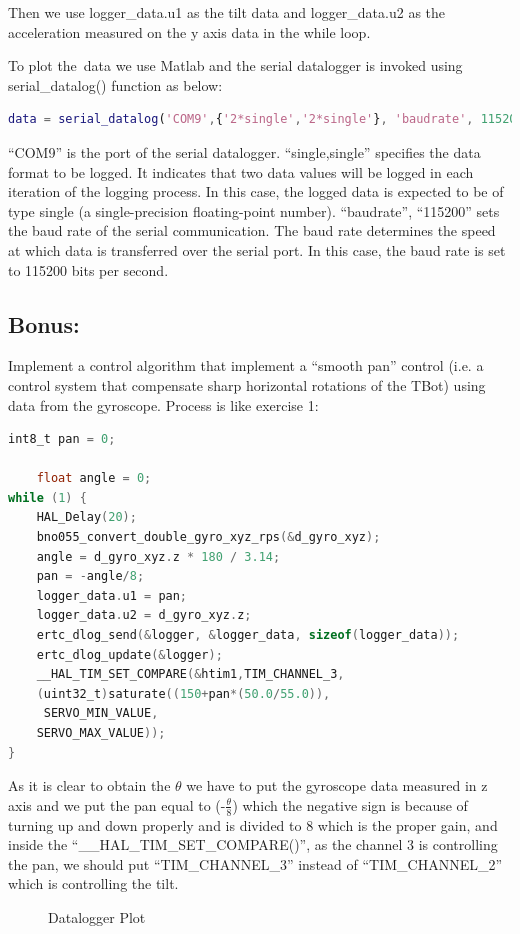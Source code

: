 \documentclass[english]{article}
\begin{document}
Then we use logger\_data.u1 as the tilt data and logger\_data.u2 as the acceleration
measured on the y axis data in the while loop. 
\newline

To plot the\ data we use Matlab and the serial datalogger is invoked using serial\_datalog()
 function as below: 
\begin{lstlisting}[language=Matlab, caption={}, label={lst:serialDatalog} ]
data = serial_datalog('COM9',{'2*single','2*single'}, 'baudrate', 115200)
\end{lstlisting}
“COM9” is the port of the serial datalogger. “single,single” specifies the data 
format to be logged. It indicates that two data values will be logged in each 
iteration of the logging process. In this case, the logged data is expected to be
of type single (a single-precision floating-point number).\newline  
“baudrate”, “115200” sets the baud rate of the serial communication. 
The baud rate determines the speed at which data is transferred over the serial port.
 In this case, the baud rate is set to 115200 bits per second. 

\subsection{Bonus:}
Implement a control algorithm that implement a “smooth pan” control
(i.e. a control system that compensate sharp horizontal rotations of the TBot) 
using data from the gyroscope.\newline
Process is like exercise 1:

\begin{lstlisting}[language=C, caption={}, label={lst:smoothPan} ]
    int8_t pan = 0; 

    float angle = 0; 
while (1) { 
    HAL_Delay(20); 
    bno055_convert_double_gyro_xyz_rps(&d_gyro_xyz);
    angle = d_gyro_xyz.z * 180 / 3.14;
    pan = -angle/8;
    logger_data.u1 = pan; 
    logger_data.u2 = d_gyro_xyz.z; 
    ertc_dlog_send(&logger, &logger_data, sizeof(logger_data)); 
    ertc_dlog_update(&logger); 
    __HAL_TIM_SET_COMPARE(&htim1,TIM_CHANNEL_3,
    (uint32_t)saturate((150+pan*(50.0/55.0)),
     SERVO_MIN_VALUE,
    SERVO_MAX_VALUE));   
} 
\end{lstlisting}
As it is clear to obtain the $\theta$ we have to put the gyroscope data measured in z axis and we put the pan equal to
(-$\frac{\theta}{8}$) which the negative sign is because of turning up and down
 properly and is divided to 8 which is the proper gain, and inside the “\_\_HAL\_TIM\_SET\_COMPARE()”, as the channel 3 is controlling the pan, 
 we should put “TIM\_CHANNEL\_3” instead of “TIM\_CHANNEL\_2” which is controlling the tilt. 
\begin{figure}[tbh]
    \centering
    
    \caption{Datalogger Plot}
    \label{fig:datal2}
\end{figure}
\end{document}
